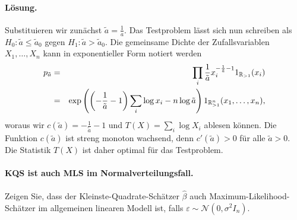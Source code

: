 \paragraph*{Lösung. } Substituieren wir zunächst $\tilde a = \frac{1}{a}$. Das Testproblem lässt sich
nun schreiben als $H_0: \tilde a \leq \tilde a_0$ gegen $H_1: \tilde a > \tilde a_0$. Die gemeinsame
Dichte der Zufallsvariablen $X_1,\ldots,X_n$ kann in exponentieller Form notiert werden
\begin{eqnarray}
    p_{\tilde a} &=& \prod_i \frac{1}{\tilde a} x_i^{ -\frac{1}{\tilde a} -1 } 1_{\mathbb R_{>1}}(x_i) \\
    &=& \exp \left( \left( -\frac{1}{\tilde a} -1 \right) \sum_{i}^{}\log x_i
    -n \log \tilde a \right) 1_{\mathbb R_{>1}^n}(x_1,\ldots,x_n), \\
\end{eqnarray}
woraus wir $c(\tilde a)=-\frac{1}{\tilde a} -1$ und $T(X)= \sum_{i}^{} \log X_i$ ablesen können.
Die Funktion $c(\tilde a)$ ist streng monoton wachsend, denn $c'(\tilde a ) >0$ für alle $\tilde a>0$. 
Die Statistik $T(X)$ ist daher optimal für das Testproblem. 







\paragraph{KQS ist auch MLS im Normalverteilungsfall. }
Zeigen Sie, dass der Kleinste-Quadrate-Schätzer $\hat \beta$ auch Maximum-Likelihood-Schätzer 
im allgemeinen linearen Modell ist, falls $\varepsilon \sim \mathcal N(0, \sigma^2 I_n)$.

